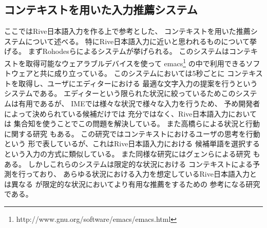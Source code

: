 \subsection{コンテキストを用いた入力推薦システム}
ここではRive日本語入力を作る上で参考とした、
コンテキストを用いた推薦システムについて述べる。
特にRive日本語入力に近いと思われるものについて挙げる。
まずRohodesらによるシステムが挙げられる。\cite{ROHODESB.J.:1997}
このシステムはコンテキストを取得可能なウェアラブルデバイスを使って
emacs\footnote{http://www.gnu.org/software/emacs/emacs.html}
の中で利用できるソフトウェアと共に成り立っている。
このシステムにおいては5秒ごとに
コンテキストを取得し、ユーザにエディターにおける
最適な文字入力の提案を行うというシステムである。
エディターという限られた状況に絞っているためこのシステムは有用であるが、
IMEでは様々な状況で様々な入力を行うため、
予め開発者によって決められている候補だけでは
充分ではなく、Rive日本語入力においては
集合知を使うことでこの問題を解決している。
また高橋らによる状況と行動に関する研究
\cite{高橋公海:2013-07-15}もある。
この研究ではコンテキストにおけるユーザの思考を行動という
形で表しているが、これはRive日本語入力における
候補単語を選択するという入力の方式に類似している。
また同様な研究にはグェンらによる研究
\cite{ミンテイグェン:2010-01-15}もある。
しかしこれらのシステムは限定的な状況における
コンテキストによる予測を行っており、
あらゆる状況における入力を想定しているRive日本語入力とは異なる
が限定的な状況においてより有用な推薦をするための
参考になる研究である。
